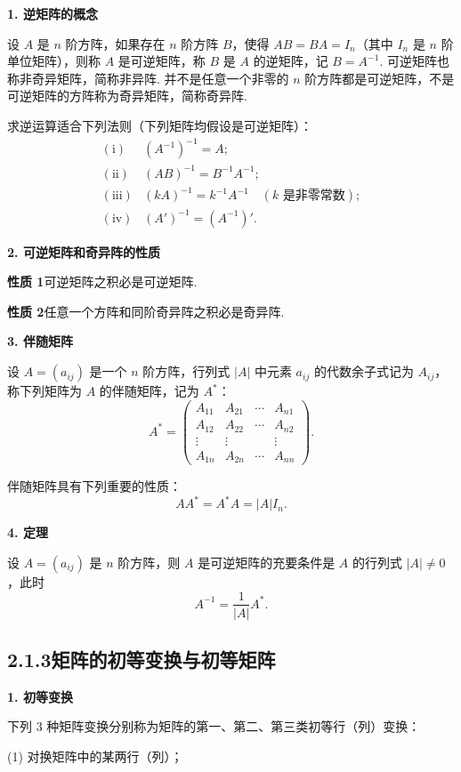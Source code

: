 \documentclass[UTF8,12pt,a4paper,fontset=fandol]{ctexart}
\begin{document}
\noindent\textbf{1. 逆矩阵的概念}

设 $A$ 是 $n$ 阶方阵，如果存在 $n$ 阶方阵 $B$，使得 $AB=BA=I_n$（其中 $I_n$ 是 $n$ 阶单位矩阵），则称 $A$ 是可逆矩阵，称 $B$ 是 $A$ 的逆矩阵，记 $B=A^{-1}$. 可逆矩阵也称非奇异矩阵，简称非异阵. 并不是任意一个非零的 $n$ 阶方阵都是可逆矩阵，不是可逆矩阵的方阵称为奇异矩阵，简称奇异阵.

求逆运算适合下列法则（下列矩阵均假设是可逆矩阵）：
\[
\begin{array}{ll}
\mathrm{(i)} & (A^{-1})^{-1}=A;\\
\mathrm{(ii)} & (AB)^{-1}=B^{-1}A^{-1};\\
\mathrm{(iii)} & (kA)^{-1}=k^{-1}A^{-1}\quad(k\text{ 是非零常数});\\
\mathrm{(iv)} & (A')^{-1}=(A^{-1})'.
\end{array}
\]

\noindent\textbf{2. 可逆矩阵和奇异阵的性质}

\noindent\textbf{性质 1}\quad 可逆矩阵之积必是可逆矩阵.

\noindent\textbf{性质 2}\quad 任意一个方阵和同阶奇异阵之积必是奇异阵.

\noindent\textbf{3. 伴随矩阵}

设 $A=(a_{ij})$ 是一个 $n$ 阶方阵，行列式 $|A|$ 中元素 $a_{ij}$ 的代数余子式记为 $A_{ij}$，称下列矩阵为 $A$ 的伴随矩阵，记为 $A^*$：
\[
A^*=
\left(
\begin{array}{cccc}
A_{11} & A_{21} & \cdots & A_{n1}\\
A_{12} & A_{22} & \cdots & A_{n2}\\
\vdots & \vdots & & \vdots\\
A_{1n} & A_{2n} & \cdots & A_{nn}
\end{array}
\right).
\]

伴随矩阵具有下列重要的性质：
\[
AA^*=A^*A=|A|I_n.
\]

\noindent\textbf{4. 定理}

设 $A=(a_{ij})$ 是 $n$ 阶方阵，则 $A$ 是可逆矩阵的充要条件是 $A$ 的行列式 $|A|\ne0$，此时
\[
A^{-1}=\frac1{|A|}A^*.
\]

\subsection*{2.1.3\quad 矩阵的初等变换与初等矩阵}

\noindent\textbf{1. 初等变换}

下列 3 种矩阵变换分别称为矩阵的第一、第二、第三类初等行（列）变换：

(1) 对换矩阵中的某两行（列）；
\end{document}
